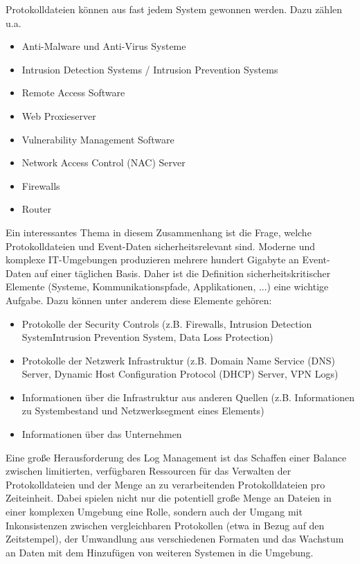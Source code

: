Protokolldateien können aus fast jedem System gewonnen werden. Dazu zählen u.a. 
\begin{itemize}
\item Anti-Malware und Anti-Virus Systeme
\item Intrusion Detection Systems / Intrusion Prevention Systems
\item Remote Access Software
\item Web Proxieserver
\item Vulnerability Management Software 
\item Network Access Control (NAC) Server
\item Firewalls
\item Router
\end{itemize}

Ein interessantes Thema in diesem Zusammenhang ist die Frage, welche Protokolldateien und Event-Daten sicherheitsrelevant sind. Moderne und komplexe IT-Umgebungen produzieren mehrere hundert Gigabyte an Event-Daten auf einer täglichen Basis. Daher ist die Definition sicherheitskritischer Elemente (Systeme, Kommunikationspfade, Applikationen, ...) eine wichtige Aufgabe.
Dazu können unter anderem diese Elemente gehören:
\begin{itemize}
\item Protokolle der Security Controls (z.B. Firewalls, Intrusion Detection System\/Intrusion Prevention System, Data Loss Protection)
\item Protokolle der Netzwerk Infrastruktur (z.B. Domain Name Service (DNS) Server, Dynamic Host Configuration Protocol (DHCP) Server, VPN Logs)
\item Informationen über die Infrastruktur aus anderen Quellen (z.B. Informationen zu Systembestand und Netzwerksegment eines Elements)
\item Informationen über das Unternehmen
\end{itemize}


Eine große Herausforderung des Log Management ist das Schaffen einer Balance zwischen limitierten, verfügbaren Ressourcen für das Verwalten der Protokolldateien und der Menge an zu verarbeitenden Protokolldateien pro Zeiteinheit. Dabei spielen nicht nur die potentiell große Menge an Dateien in einer komplexen Umgebung eine Rolle, sondern auch der Umgang mit Inkonsistenzen zwischen vergleichbaren Protokollen (etwa in Bezug auf den Zeitstempel), der Umwandlung aus verschiedenen Formaten und das Wachstum an Daten mit dem Hinzufügen von weiteren Systemen in die Umgebung.

